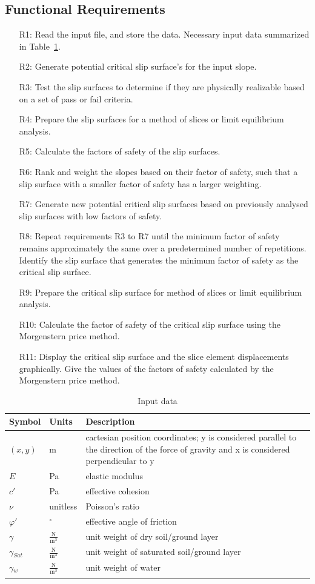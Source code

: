 \documentclass[12pt]{article}
\begin{document}
\subsection{Functional Requirements}
\label{Sec:FR}
\begin{itemize}
\item[R1:]Read the input file, and store the data. Necessary input data summarized in Table~\ref{Table:Id}.
\item[R2:]Generate potential critical slip surface's for the input slope.
\item[R3:]Test the slip surfaces to determine if they are physically realizable based on a set of pass or fail criteria.
\item[R4:]Prepare the slip surfaces for a method of slices or limit equilibrium analysis.
\item[R5:]Calculate the factors of safety of the slip surfaces.
\item[R6:]Rank and weight the slopes based on their factor of safety, such that a slip surface with a smaller factor of safety has a larger weighting.
\item[R7:]Generate new potential critical slip surfaces based on previously analysed slip surfaces with low factors of safety.
\item[R8:]Repeat requirements R3 to R7 until the minimum factor of safety remains approximately the same over a predetermined number of repetitions. Identify the slip surface that generates the minimum factor of safety as the critical slip surface.
\item[R9:]Prepare the critical slip surface for method of slices or limit equilibrium analysis.
\item[R10:]Calculate the factor of safety of the critical slip surface using the Morgenstern price method.
\item[R11:]Display the critical slip surface and the slice element displacements graphically. Give the values of the factors of safety calculated by the Morgenstern price method.
\end{itemize}
\begin{longtable}{l l l}
\toprule
Symbol & Units & Description
\\
\midrule
$(x,y)$ & m & cartesian position coordinates; y is considered parallel to the direction of the force of gravity and x is considered perpendicular to y
\\
$E$ & Pa & elastic modulus
\\
$c'$ & Pa & effective cohesion
\\
$\nu{}$ & unitless & Poisson's ratio
\\
$\varphi{}'$ & ${}^{\circ}$ & effective angle of friction
\\
$\gamma{}$ & $\frac{\text{N}}{\text{m}^{3}}$ & unit weight of dry soil/ground layer
\\
$\gamma{}_{Sat}$ & $\frac{\text{N}}{\text{m}^{3}}$ & unit weight of saturated soil/ground layer
\\
$\gamma{}_{w}$ & $\frac{\text{N}}{\text{m}^{3}}$ & unit weight of water
\\
\bottomrule
\caption{Input data}
\label{Table:Id}
\end{longtable}
\end{document}
